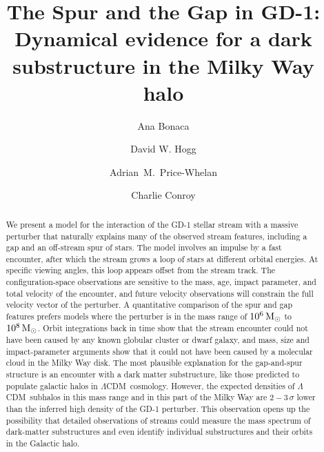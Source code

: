 \documentclass[twocolumn]{aastex62}
\newcommand{\acronym}[1]{{\small{#1}}}
\newcommand{\lcdm}{\acronym{$\Lambda$CDM}}
\begin{document}
\sloppy\sloppypar\raggedbottom\frenchspacing

\title{\textbf{%
The Spur and the Gap in GD-1:\\
Dynamical evidence for a dark substructure in the Milky Way halo
}}


\author[0000-0002-7846-9787]{Ana Bonaca}

\author[0000-0003-2866-9403]{David W. Hogg}

\author[0000-0003-0872-7098]{Adrian~M.~Price-Whelan}

\author[0000-0002-1590-8551]{Charlie Conroy}

\begin{abstract}\noindent
We present a model for the interaction of the GD-1 stellar stream with a massive perturber that naturally explains many of the observed stream features, including a gap and an off-stream spur of stars.
The model involves an impulse by a fast encounter, after which the stream grows a loop of stars at different orbital energies.
At specific viewing angles, this loop appears offset from the stream track.
The configuration-space observations are sensitive to the mass, age, impact parameter, and total velocity of the encounter, and future velocity observations will constrain the full velocity vector of the perturber.
A quantitative comparison of the spur and gap features prefers models where the perturber is in the mass range of $10^6\,\rm M_\odot$ to $10^8\,\rm M_\odot$.
Orbit integrations back in time show that the stream encounter could not have been caused by any known globular cluster or dwarf galaxy, and mass, size and impact-parameter arguments show that it could not have been caused by a molecular cloud in the Milky Way disk.
The most plausible explanation for the gap-and-spur structure is an encounter with a dark matter substructure, like those predicted to populate galactic halos in \lcdm\ cosmology.
However, the expected densities of \lcdm\ subhalos in this mass range and in this part of the Milky Way are $2-3\,\sigma$ lower than the inferred high density of the GD-1 perturber.
This observation opens up the possibility that detailed observations of streams could measure the mass spectrum of dark-matter substructures and even identify individual substructures and their orbits in the Galactic halo.
\end{abstract}
\end{document}
